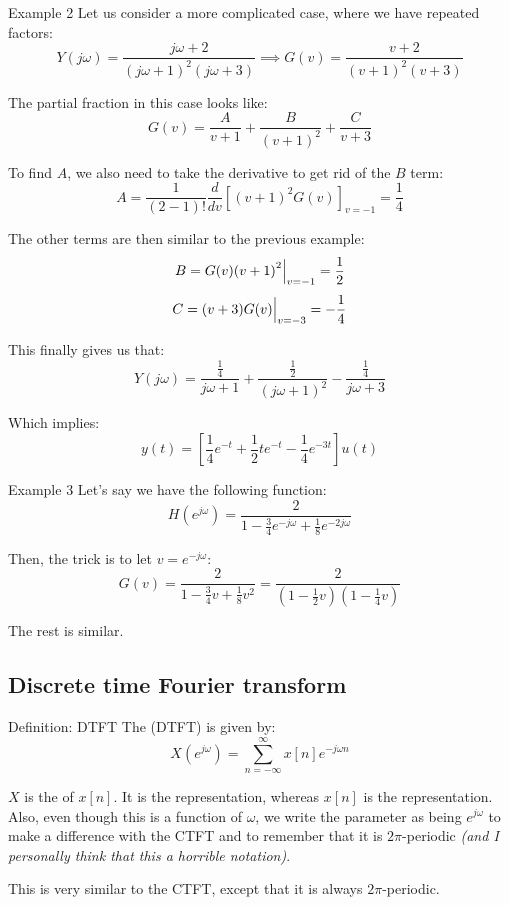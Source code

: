 \documentclass[a4paper]{article}
\begin{document}
\begin{parag}{Example 2}
    Let us consider a more complicated case, where we have repeated factors: 
    \[Y\left(j \omega\right) = \frac{j \omega + 2}{\left(j \omega + 1\right)^2 \left(j \omega + 3\right)} \implies G\left(v\right) = \frac{v+2}{\left(v + 1\right)^2 \left(v+3\right)}\]
    
    The partial fraction in this case looks like: 
    \[G\left(v\right) = \frac{A}{v+1} + \frac{B}{\left(v+1\right)^2} + \frac{C}{v+3}\]
    
    To find $A$, we also need to take the derivative to get rid of the $B$ term: 
    \[A = \frac{1}{\left(2 - 1\right)!} \frac{d}{dv} \left[\left(v+1\right)^2 G\left(v\right)\right]_{v = -1} = \frac{1}{4}\]
    
    The other terms are then similar to the previous example: 
    \[B = G\left(v\right)\left(v+1\right)^2 \eval_{v = -1}^{} = \frac{1}{2}\]
    \[C = \left(v+3\right)G\left(v\right) \eval_{v=-3}^{} = -\frac{1}{4}\]

    This finally gives us that: 
    \[Y\left(j \omega\right) = \frac{\frac{1}{4}}{j \omega+ 1} + \frac{\frac{1}{2}}{\left(j\omega + 1\right)^2} - \frac{\frac{1}{4}}{j \omega+ 3}\]
    
    Which implies: 
    \[y\left(t\right) = \left[\frac{1}{4} e^{-t} + \frac{1}{2} t e^{-t} - \frac{1}{4} e^{-3t}\right]u\left(t\right)\]
\end{parag}

\begin{parag}{Example 3}
    Let's say we have the following function: 
    \[H\left(e^{j \omega}\right) = \frac{2}{1 - \frac{3}{4} e^{-j \omega} + \frac{1}{8} e^{-2 j \omega}}\]
    
    Then, the trick is to let $v = e^{-j \omega}$:
    \[G\left(v\right) = \frac{2}{ 1 - \frac{3}{4} v + \frac{1}{8}v^2} = \frac{2}{\left(1 - \frac{1}{2}v\right)\left(1 - \frac{1}{4}v\right)}\]
    
    The rest is similar.
\end{parag}

\subsection{Discrete time Fourier transform}

\begin{parag}{Definition: DTFT}
    The  (DTFT) is given by: 
    \[X\left(e^{j \omega}\right) = \sum_{n=-\infty}^{\infty} x\left[n\right]e^{-j \omega n}\]

    $X$ is the  of $x\left[n\right]$. It is the  representation, whereas $x\left[n\right]$ is the  representation. Also, even though this is a function of $\omega$, we write the parameter as being $e^{j \omega}$ to make a difference with the CTFT and to remember that it is $2\pi$-periodic \textit{(and I personally think that this a horrible notation)}.

    This is very similar to the CTFT, except that it is always $2\pi$-periodic.
\end{parag}
\end{document}
